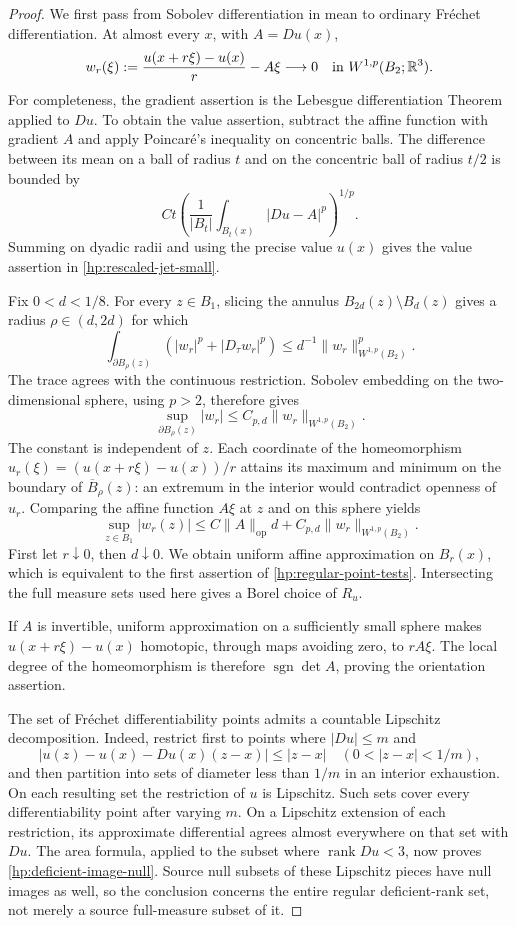\documentclass[11pt]{article}
\numberwithin{equation}{section}
\theoremstyle{definition}
\theoremstyle{remark}
\begin{document}
\begin{proof}
We first pass from Sobolev differentiation in mean to ordinary
Fr\'echet differentiation.  At almost every $x$, with $A=Du(x)$,
\begin{equation}\label{hp:rescaled-jet-small}
 w_r(\xi):=\frac{u(x+r\xi)-u(x)}{r}-A\xi
 \longrightarrow0 \quad\hbox{in }W^{1,p}(B_2;\mathbb R^3).
\end{equation}
For completeness, the gradient assertion is the Lebesgue differentiation
Theorem applied to $Du$.  To obtain the value assertion, subtract the
affine function with gradient $A$ and apply Poincar\'e's inequality on
concentric balls.  The difference between its mean on a ball of radius
$t$ and on the concentric ball of radius $t/2$ is bounded by
\[
 Ct\left(\frac{1}{|B_t|}\int_{B_t(x)}|Du-A|^p\right)^{1/p}.
\]
Summing on dyadic radii and using the precise value $u(x)$ gives the
value assertion in \eqref{hp:rescaled-jet-small}.

Fix $0<d<1/8$.  For every $z\in B_1$, slicing the annulus
$B_{2d}(z)\setminus B_d(z)$ gives a radius $\rho\in(d,2d)$ for which
\[
 \int_{\partial B_\rho(z)}
   (|w_r|^p+|D_\tau w_r|^p)
 \le d^{-1}\|w_r\|_{W^{1,p}(B_2)}^p.
\]
The trace agrees with the continuous restriction.  Sobolev embedding
on the two-dimensional sphere, using $p>2$, therefore gives
\[
 \sup_{\partial B_\rho(z)}|w_r|
 \le C_{p,d}\|w_r\|_{W^{1,p}(B_2)}.
\]
The constant is independent of $z$.  Each coordinate of the
homeomorphism
$u_r(\xi)=(u(x+r\xi)-u(x))/r$ attains its maximum and minimum on
the boundary of $\overline B_\rho(z)$: an extremum in the interior
would contradict openness of $u_r$.  Comparing the affine function
$A\xi$ at $z$ and on this sphere yields
\[
 \sup_{z\in B_1}|w_r(z)|
 \le C\|A\|_{\mathrm{op}}d+C_{p,d}\|w_r\|_{W^{1,p}(B_2)}.
\]
First let $r\downarrow0$, then $d\downarrow0$.  We obtain uniform
affine approximation on $B_r(x)$, which is equivalent to the first
assertion of \eqref{hp:regular-point-tests}.  Intersecting the full
measure sets used here gives a Borel choice of $R_u$.

If $A$ is invertible, uniform approximation on a sufficiently small
sphere makes $u(x+r\xi)-u(x)$ homotopic, through maps avoiding zero,
to $rA\xi$.  The local degree of the homeomorphism is therefore
$\operatorname{sgn}\det A$, proving the orientation assertion.

The set of Fr\'echet differentiability points admits a countable
Lipschitz decomposition.  Indeed, restrict first to points where
$|Du|\le m$ and
\[
 |u(z)-u(x)-Du(x)(z-x)|\le |z-x|
 \quad(0<|z-x|<1/m),
\]
and then partition into sets of diameter less than $1/m$ in an
interior exhaustion.  On each resulting set the restriction of $u$
is Lipschitz.  Such sets cover every differentiability point after
varying $m$.  On a Lipschitz extension of each restriction, its
approximate differential agrees almost everywhere on that set with
$Du$.  The area formula, applied to the subset where $\operatorname{rank} Du<3$,
now proves \eqref{hp:deficient-image-null}.  Source null subsets of
these Lipschitz pieces have null images as well, so the conclusion
concerns the entire regular deficient-rank set, not merely a source
full-measure subset of it.


\end{proof}
\end{document}
